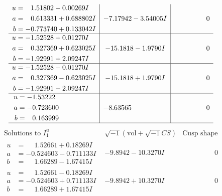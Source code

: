 \documentclass[1p]{elsarticle_modified}
\theoremstyle{definition}
\newcommand{\I}{\sqrt{-1}}
\begin{document}
$$\begin{array}{c|c|c}
\begin{aligned}
u &= \phantom{-}1.51802 - 0.00269 I \\
a &= \phantom{-}0.613331 + 0.688802 I \\
b &= -0.773740 + 0.133042 I\end{aligned}
 & -7.17942 - 3.54005 I & \phantom{-0.000000 } 0 \\ \hline\begin{aligned}
u &= -1.52528 + 0.01270 I \\
a &= \phantom{-}0.327369 + 0.623025 I \\
b &= -1.92991 + 2.09247 I\end{aligned}
 & -15.1818 - 1.9790 I & \phantom{-0.000000 } 0 \\ \hline\begin{aligned}
u &= -1.52528 - 0.01270 I \\
a &= \phantom{-}0.327369 - 0.623025 I \\
b &= -1.92991 - 2.09247 I\end{aligned}
 & -15.1818 + 1.9790 I & \phantom{-0.000000 } 0 \\ \hline\begin{aligned}
u &= -1.53222\phantom{ +0.000000I} \\
a &= -0.723600\phantom{ +0.000000I} \\
b &= \phantom{-}0.163999\phantom{ +0.000000I}\end{aligned}
 & -8.63565\phantom{ +0.000000I} & \phantom{-0.000000 } 0\\
 \hline 
 \end{array}$$\newpage$$\begin{array}{c|c|c}  
\text{Solutions to }I^u_{1}& \I (\text{vol} + \sqrt{-1}CS) & \text{Cusp shape}\\
 \hline 
\begin{aligned}
u &= \phantom{-}1.52661 + 0.18269 I \\
a &= -0.524603 - 0.711133 I \\
b &= \phantom{-}1.66289 - 1.67415 I\end{aligned}
 & -9.8942 - 10.3270 I & \phantom{-0.000000 } 0 \\ \hline\begin{aligned}
u &= \phantom{-}1.52661 - 0.18269 I \\
a &= -0.524603 + 0.711133 I \\
b &= \phantom{-}1.66289 + 1.67415 I\end{aligned}
 & -9.8942 + 10.3270 I & \phantom{-0.000000 } 0 \\ \hline\begin{aligned}

\end{aligned}
\end{array}$$
\end{document}
